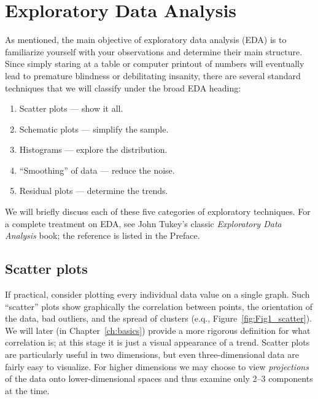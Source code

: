 \section{Exploratory Data Analysis}

	As mentioned, the main objective of exploratory data analysis (EDA) is to familiarize yourself with 
your observations and determine their main structure.  Since simply staring at a table or computer printout of numbers will 
eventually lead to premature blindness or debilitating insanity, there are several standard techniques that we will 
classify under the broad EDA heading:

\begin{enumerate}
\item	Scatter plots --- show it all.
\item	Schematic plots --- simplify the sample.
\item	Histograms --- explore the distribution.
\item	``Smoothing'' of data --- reduce the noise.
\item	Residual plots --- determine the trends.
\end{enumerate}

We will briefly discuss each of these five categories of exploratory techniques.  For a complete 
treatment on EDA, see John Tukey's classic \emph{Exploratory Data Analysis} book; the reference is listed in the Preface.

\subsection{Scatter plots}


	If practical, consider plotting every individual data value on a single graph.  Such ``scatter'' plots show 
graphically the correlation between points, the orientation of the data, bad outliers, and the spread of
clusters (e.q., Figure~\ref{fig:Fig1_scatter}).  
We will later (in Chapter~\ref{ch:basics}) provide a more rigorous definition for what correlation is; at this stage it is just 
a visual appearance of a trend.  Scatter plots are particularly useful in two dimensions, but even three-dimensional
data are fairly easy to visualize.  For higher dimensions we may choose to view \emph{projections} of the data
onto lower-dimensional spaces and thus examine only 2--3 components at the time.

